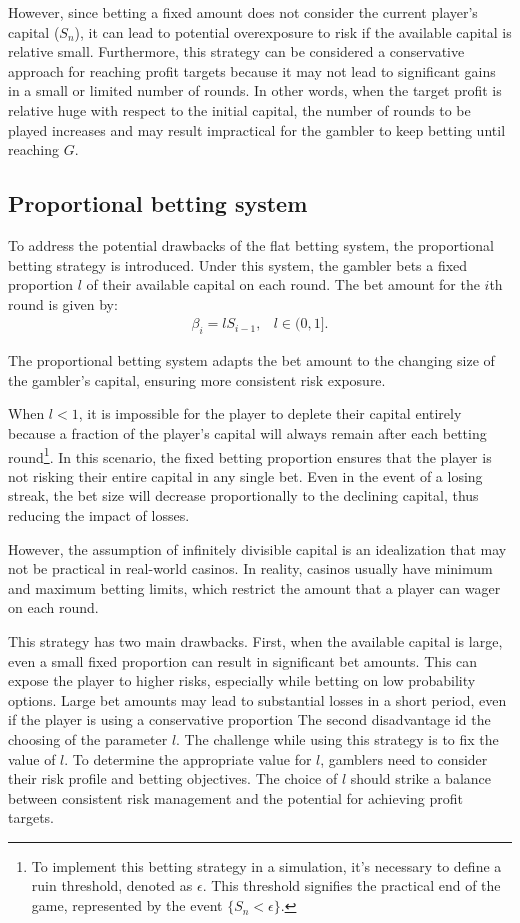 \documentclass[11pt,twoside]{article}
\numberwithin{Theorem}{section}
\numberwithin{Definition}{section}
\numberwithin{Lemma}{section}
\numberwithin{Algorithm}{section}
\numberwithin{equation}{section}
\begin{document}
However, since betting a fixed amount does not consider the current player's capital ($S_{n}$), it can lead to potential overexposure to risk if the available capital is relative small. Furthermore, this strategy can be considered a conservative approach for reaching profit targets because it may not lead to significant gains in a small or limited number of rounds. In other words, when the target profit is relative huge with respect to the initial capital, the number of rounds to be played increases and may result impractical for the gambler to keep betting until reaching $G$.


\subsection{Proportional betting system}
To address the potential drawbacks of the flat betting system, the proportional betting strategy is introduced. Under this system, the gambler bets a fixed proportion $l$ of their available capital on each round. The bet amount for the $i$th round is given by:
\begin{eqnarray}
     \beta_{i} = lS_{i-1},  & l\in (0,1].
\end{eqnarray}
   
The proportional betting system adapts the bet amount to the changing size of the gambler's capital, ensuring more consistent risk exposure. 

When $l<1$, it is impossible for the player to deplete their capital entirely because a fraction of the player's capital will always remain after each betting round\footnote{To implement this betting strategy in a simulation, it's necessary to define a ruin threshold, denoted as $\epsilon$. This threshold signifies the practical end of the game, represented by the event $\{S_{n} < \epsilon\}$.}. In this scenario, the fixed betting proportion ensures that the player is not risking their entire capital in any single bet. Even in the event of a losing streak, the bet size will decrease proportionally to the declining capital, thus reducing the impact of losses. 

However, the assumption of infinitely divisible capital is an idealization that may not be practical in real-world casinos. In reality, casinos usually have minimum and maximum betting limits, which restrict the amount that a player can wager on each round. 

This strategy has two main drawbacks. First, when the available capital is large, even a small fixed proportion can result in significant bet amounts. This can expose the player to higher risks, especially while betting on low probability options. Large bet amounts may lead to substantial losses in a short period, even if the player is using a conservative proportion
The second disadvantage id the choosing of the parameter $l$. The challenge while using this strategy is to fix the value of $l$. To determine the appropriate value for $l$, gamblers need to consider their risk profile and betting objectives. The choice of $l$ should strike a balance between consistent risk management and the potential for achieving profit targets.
\end{document}
